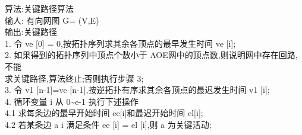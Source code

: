 \documentclass[10pt]{article}
\begin{document}
算法:关键路径算法\\
输人: 有向网图 G= (V,E)\\
输出:关键路径\\[0pt]
1. 令 ve [0] = 0,按拓扑序列求其余各顶点的最早发生时间 ve [i];\\
2. 如果得到的拓扑序列中顶点个数小于 AOE网中的顶点数,则说明网中存在回路,不能\\
求关键路径,算法终止;否则执行步骤 3;\\[0pt]
3. 令 v1 [n-1]=ve [n-1],按逆拓扑有序求其余各顶点的最迟发生时间 v1 [i];\\
4. 循环变量 i 从 0\~{}e-1 执行下述操作\\[0pt]
4.1 求每条边的最早开始时间 ee[i]和最迟开始时间 el[i];\\[0pt]
4.2 若某条边 a i 满足条件 ee [i] = el [i],则 a 为关键活动;
\end{document}
